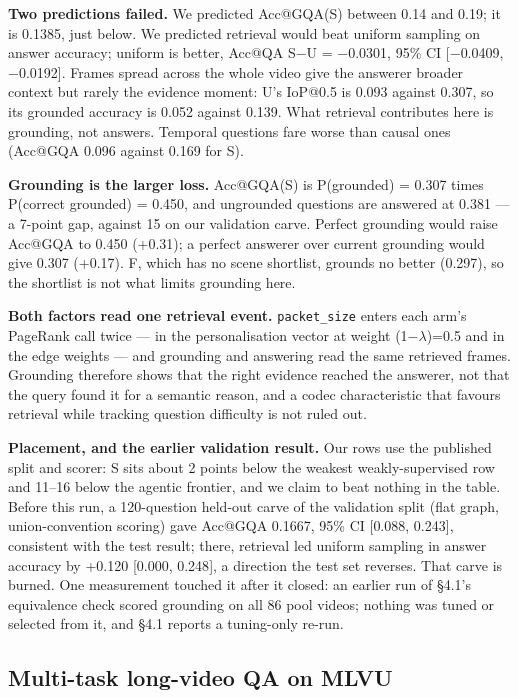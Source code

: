 \documentclass[sigconf,review,anonymous]{acmart}
\begin{document}
\textbf{Two predictions failed.} We predicted Acc@GQA(S) between 0.14 and 0.19; it is 0.1385, just
below. We predicted retrieval would beat uniform sampling on answer accuracy; uniform is
better, Acc@QA S\ensuremath{-}U = \ensuremath{-}0.0301, 95\% CI {[}\ensuremath{-}0.0409, \ensuremath{-}0.0192{]}. Frames spread across the whole
video give the answerer broader context but rarely the evidence moment: U's IoP@0.5 is 0.093
against 0.307, so its grounded accuracy is 0.052 against 0.139. What retrieval contributes here
is grounding, not answers. Temporal questions fare worse than causal ones (Acc@GQA 0.096
against 0.169 for S).

\textbf{Grounding is the larger loss.} Acc@GQA(S) is P(grounded) = 0.307 times
P(correct \textbar{} grounded) = 0.450, and ungrounded questions are answered at 0.381 --- a 7-point
gap, against 15 on our validation carve. Perfect grounding would raise Acc@GQA to 0.450 (+0.31);
a perfect answerer over current grounding would give 0.307 (+0.17). F, which has no scene
shortlist, grounds no better (0.297), so the shortlist is not what limits grounding here.

\textbf{Both factors read one retrieval event.} \texttt{packet\_size} enters each arm's PageRank call
twice --- in the personalisation vector at weight (1\ensuremath{-}\ensuremath{\lambda})=0.5 and in the edge weights ---
and grounding and answering read the same retrieved frames. Grounding therefore shows that the
right evidence reached the answerer, not that the query found it for a semantic reason, and a
codec characteristic that favours retrieval while tracking question difficulty is not ruled out.

\textbf{Placement, and the earlier validation result.} Our rows use the published split and
scorer: S sits about 2 points below the weakest weakly-supervised row and 11--16 below the
agentic frontier, and we claim to beat nothing in the table. Before this run, a 120-question
held-out carve of the validation split (flat graph, union-convention scoring) gave Acc@GQA
0.1667, 95\% CI {[}0.088, 0.243{]}, consistent with the test result; there, retrieval led uniform
sampling in answer accuracy by +0.120 {[}0.000, 0.248{]}, a direction the test set reverses. That
carve is burned. One measurement touched it after it closed: an earlier run of §4.1's
equivalence check scored grounding on all 86 pool videos; nothing was tuned or selected from
it, and §4.1 reports a tuning-only re-run.

\subsection{Multi-task long-video QA on MLVU}
\end{document}
